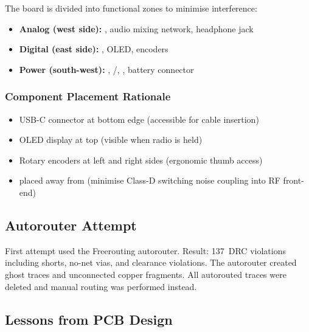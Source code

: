 The board is divided into functional zones to minimise interference:

\begin{itemize}[leftmargin=1.8em, itemsep=2pt]
  \item \textbf{Analog (west side):} , audio mixing network,
        headphone jack
  \item \textbf{Digital (east side):} ,  OLED,
        encoders
  \item \textbf{Power (south-west):} , /,
        , battery connector
\end{itemize}

\subsubsection{Component Placement Rationale}

\begin{itemize}[leftmargin=1.8em, itemsep=2pt]
  \item USB-C connector at bottom edge (accessible for cable insertion)
  \item OLED display at top (visible when radio is held)
  \item Rotary encoders at left and right sides (ergonomic thumb access)
  \item {} placed away from  (minimise Class-D
        switching noise coupling into RF front-end)
\end{itemize}

\subsection{Autorouter Attempt}

\begin{calloutfail}
First attempt used the Freerouting autorouter.  Result: 137~DRC violations
including shorts, no-net vias, and clearance violations.  The autorouter
created ghost traces and unconnected copper fragments.  All autorouted traces
were deleted and manual routing was performed instead.
\end{calloutfail}


\subsection{Lessons from PCB Design}

